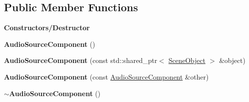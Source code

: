 \subsection*{Public Member Functions}
\begin{Indent}\textbf{ Constructors/\+Destructor}\par
\begin{DoxyCompactItemize}
\item 
\mbox{\label{classrev_1_1_audio_source_component_a3cc8ffdd4defa7d7713e8bafe388658a}} 
{\bfseries Audio\+Source\+Component} ()
\item 
\mbox{\label{classrev_1_1_audio_source_component_aa8fd9e66cc59dcb5b7a784cb302b666a}} 
{\bfseries Audio\+Source\+Component} (const std\+::shared\+\_\+ptr$<$ \mbox{\hyperlink{classrev_1_1_scene_object}{Scene\+Object}} $>$ \&object)
\item 
\mbox{\label{classrev_1_1_audio_source_component_abd9fe0fd5f58ac595fa9bd8f98be8a33}} 
{\bfseries Audio\+Source\+Component} (const \mbox{\hyperlink{classrev_1_1_audio_source_component}{Audio\+Source\+Component}} \&other)
\item 
\mbox{\label{classrev_1_1_audio_source_component_afe2611de438f4193606baada8465e685}} 
{\bfseries $\sim$\+Audio\+Source\+Component} ()
\end{DoxyCompactItemize}
\end{Indent}
